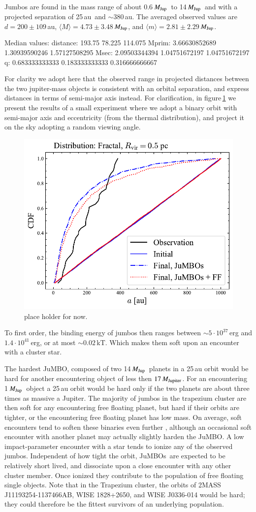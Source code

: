 \documentclass[aa]{lib/aa}
\newcommand{\MJup}{\mbox{${M}_{\rm Jup}$}}
\newcommand{\jumbo}{\mbox{JuMBO}}
\newcommand{\jumbos}{\mbox{JuMBOs}}
\begin{document}
Jumbos are found in the mass range of about 0.6\,\MJup\, to
14\,\MJup\, and with a projected separation of 25\,au\, and $\sim
380$\,au.  The averaged observed values are $d=200\pm109$\,au,
$\langle M\rangle = 4.73\pm3.48$\,\MJup, and $\langle m\rangle =
2.81\pm2.29$\,\MJup.

Median values:
distance: 193.75 78.225 114.075
Mprim: 3.66630852689 1.30939590246 1.57127508295
Msec: 2.09503344394 1.04751672197 1.04751672197
q: 0.683333333333 0.183333333333 0.316666666667

For clarity we adopt here that the observed
range in projected distances between the two jupiter-mass objects is
consistent with an orbital separation, and express distances in terms
of semi-major axis instead.
For clarification, in figure\,\ref{fig:projected_separation} we present the results of a
small experiment where we adopt a binary orbit with semi-major axis
and eccentricity (from the thermal distribution), and project it on
the sky adopting a random viewing angle.

\begin{figure}
    \centering
    \includegraphics[width=.4\columnwidth]{figures/projected_separation.pdf}
         \caption{place holder for now.}
         \label{fig:projected_separation}
\end{figure}

To first order, the binding energy of jumbos then ranges between $\sim
5\cdot 10^{37}$\,erg and $1.4\cdot 10^{41}$\,erg, or at most $\sim
0.02$\,kT. Which makes them soft upon an encounter with a cluster
star.

The hardest \jumbo, composed of two 14\,\MJup\, planets in a 25\,au
orbit would be hard for another encountering object of less then
$17\,M_{\rm Jupiter}$.  For an encountering 1\,\MJup\, object a 25\,au
orbit would be hard only if the two planets are about three times as
massive a Jupiter.  The majority of jumbos in the trapezium cluster
are then soft for any encountering free floating planet, but hard if
their orbits are tighter, or the encountering free floating planet has
low mass.  On average, soft encounters tend to soften these binaries
even further \citep{1975MNRAS.173..729H}, although an occasional soft
encounter with another planet may actually slightly harden the \jumbo.
A low impact-parameter encounter with a star tends to ionize any of
the observed jumbos.  Independent of how tight the orbit, \jumbos\,
are expected to be relatively short lived, and dissociate upon a close
encounter with any other cluster member.  Once ionized they contribute
to the population of free floating single objects.  Note that in the
Trapezium cluster, the orbits of 2MASS J11193254-1137466AB, WISE
1828+2650, and WISE J0336-014 would be hard; they could therefore be
the fittest survivors of an underlying population.
\end{document}
